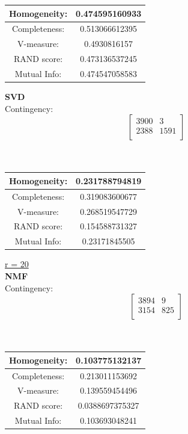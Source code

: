 \documentclass{report}
\begin{document}
\begin{center}
\begin{tabu}{| c | c |}
\hline
Homogeneity: 		& 0.474595160933 \\
\hline
Completeness: 		& 0.513066612395 \\
\hline
V-measure: 			& 0.4930816157 \\
\hline
RAND score: 		& 0.473136537245 \\
\hline
Mutual Info: 		& 0.474547058583 \\
\hline
\end{tabu}
\end{center}


\textbf{SVD} \\
Contingency:\[ 
\begin{bmatrix}
3900    	& 3 \\
2388 		& 1591 \\
\end{bmatrix}
\]
\\ \\

\begin{center}
\begin{tabu}{| c | c |}
\hline
Homogeneity: 		& 0.231788794819 \\
\hline
Completeness: 		& 0.319083600677 \\
\hline
V-measure: 			& 0.268519547729 \\
\hline
RAND score: 		& 0.154588731327 \\
\hline
Mutual Info: 		& 0.23171845505 \\
\hline
\end{tabu}
\end{center}

\underline{r = 20} \\
\textbf{NMF} \\
Contingency: \[
\begin{bmatrix}
3894    	& 9 \\
3154  		& 825 \\
\end{bmatrix}
\]
\\ \\

\begin{center}
\begin{tabu}{| c | c |}
\hline
Homogeneity: 		& 0.103775132137 \\
\hline
Completeness: 		& 0.213011153692 \\
\hline
V-measure: 			& 0.139559454496 \\
\hline
RAND score: 		& 0.0388697375327 \\
\hline
Mutual Info: 		& 0.103693048241 \\
\hline
\end{tabu}
\end{center}
\end{document}
